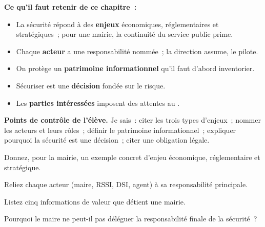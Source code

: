 \begin{boxresume}
\textbf{Ce qu'il faut retenir de ce chapitre~:}
\begin{itemize}
    \item La sécurité répond à des \textbf{enjeux} économiques,
          réglementaires et stratégiques~; pour une mairie, la continuité du
          service public prime.
    \item Chaque \textbf{acteur} a une responsabilité nommée~; la direction
          assume, le  pilote.
    \item On protège un \textbf{patrimoine informationnel} qu'il faut d'abord
          inventorier.
    \item Sécuriser est une \textbf{décision} fondée sur le risque.
    \item Les \textbf{parties intéressées} imposent des attentes au
          .
\end{itemize}
\end{boxresume}

\begin{boxinfo}
\textbf{Points de contrôle de l'élève.} Je sais~: citer les trois types
d'enjeux~; nommer les acteurs et leurs rôles~; définir le patrimoine
informationnel~; expliquer pourquoi la sécurité est une décision~; citer une
obligation légale.
\end{boxinfo}

\bigskip

\begin{boxexo}[title={\ding{45}\quad Exercice~2.1. Trois enjeux \niveaubase}]
Donnez, pour la mairie, un exemple concret d'enjeu économique, réglementaire
et stratégique.
\end{boxexo}

\begin{boxexo}[title={\ding{45}\quad Exercice~2.2. Qui fait quoi \niveaubase}]
Reliez chaque acteur (maire, RSSI, DSI, agent) à sa responsabilité principale.
\end{boxexo}

\begin{boxexo}[title={\ding{45}\quad Exercice~2.3. Inventaire \niveaubase}]
Listez cinq informations de valeur que détient une mairie.
\end{boxexo}

\begin{boxexo}[title={\ding{45}\quad Exercice~2.4. Responsabilité finale \niveaumoyen}]
Pourquoi le maire ne peut-il pas déléguer la responsabilité finale de la
sécurité~?
\end{boxexo}

